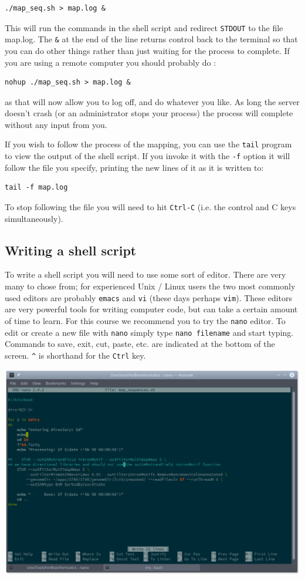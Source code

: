 \documentclass[11pt]{article}
\begin{document}
\begin{verbatim}
./map_seq.sh > map.log &
\end{verbatim}

This will run the commands in the shell script and redirect \texttt{STDOUT} to the
file map.log. The \texttt{\&} at the end of the line returns control back to the
terminal so that you can do other things rather than just waiting for the
process to complete.
If you are using a remote computer you should probably do :


\begin{verbatim}
nohup ./map_seq.sh > map.log &
\end{verbatim}

as that will now allow you to log off, and do whatever you like. As long the
server doesn't crash (or an administrator stops your process) the process
will complete without any input from you.

If you wish to follow the process of the mapping, you can use the \texttt{tail}
program to view the output of the shell script. If you invoke it with the
\texttt{-f} option it will follow the file you specify, printing the new lines of it
as it is written to:


\begin{verbatim}
tail -f map.log
\end{verbatim}

To stop following the file you will need to hit \texttt{Ctrl-C} (i.e. the control and
C keys simultaneously).
\subsection{Writing a shell script}
\label{sec-3-3}

To write a shell script you will need to use some sort of editor. There are
very many to chose from; for experienced Unix / Linux users the two most
commonly used editors are probably \texttt{emacs} and \texttt{vi} (these days perhaps
\texttt{vim}). These editors are very powerful tools for writing computer code, but
can take a certain amount of time to learn. For this course we recommend you
to try the \texttt{nano} editor. To edit or create a new file with \texttt{nano} simply
type \texttt{nano filename} and start typing. Commands to save, exit, cut, paste,
etc. are indicated at the bottom of the screen. \texttt{\textasciicircum{}} is shorthand for the
\texttt{Ctrl} key.

\includegraphics[width=.9\linewidth]{nanoShell.png}
\end{document}
